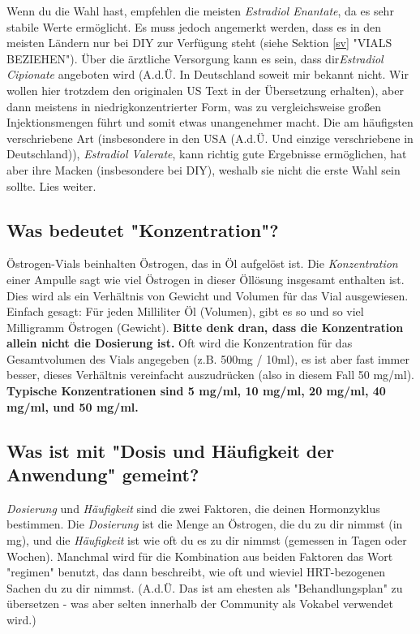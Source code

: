 \documentclass{article}
\begin{document}
Wenn du die Wahl hast, empfehlen die meisten \textit{Estradiol Enantate}, da es sehr stabile Werte ermöglicht. Es muss jedoch angemerkt werden, dass es in den meisten Ländern nur bei DIY zur Verfügung steht (siehe Sektion \ref{sv} "VIALS BEZIEHEN"). Über die ärztliche Versorgung kann es sein, dass dir\textit{Estradiol Cipionate} angeboten wird (A.d.Ü. In Deutschland soweit mir bekannt nicht. Wir wollen hier trotzdem den originalen US Text in der Übersetzung erhalten), aber dann meistens in niedrigkonzentrierter Form, was zu vergleichsweise großen Injektionsmengen führt und somit etwas unangenehmer macht. Die am häufigsten verschriebene Art (insbesondere in den USA (A.d.Ü. Und einzige verschriebene in Deutschland)), \textit{Estradiol Valerate}, kann richtig gute Ergebnisse ermöglichen, hat aber ihre Macken (insbesondere bei DIY), weshalb sie nicht die erste Wahl sein sollte. Lies weiter.

\subsection{Was bedeutet "Konzentration"?}

Östrogen-Vials beinhalten Östrogen, das in Öl aufgelöst ist. Die \textit{Konzentration} einer Ampulle sagt wie viel Östrogen in dieser Öllösung insgesamt enthalten ist. Dies wird als ein Verhältnis von Gewicht und Volumen für das Vial ausgewiesen. Einfach gesagt: Für jeden Milliliter Öl (Volumen), gibt es so und so viel Milligramm Östrogen (Gewicht). \textbf{Bitte denk dran, dass die Konzentration allein nicht die Dosierung ist.} Oft wird die Konzentration für das Gesamtvolumen des Vials angegeben (z.B. 500mg / 10ml), es ist aber fast immer besser, dieses Verhältnis vereinfacht auszudrücken (also in diesem Fall 50 mg/ml). \textbf{Typische Konzentrationen sind 5 mg/ml, 10 mg/ml, 20 mg/ml, 40 mg/ml, und 50 mg/ml.}

\subsection{Was ist mit "Dosis und Häufigkeit der Anwendung" gemeint?}

\textit{Dosierung} und \textit{Häufigkeit} sind die zwei Faktoren, die deinen Hormonzyklus bestimmen. Die \textit{Dosierung} ist die Menge an Östrogen, die du zu dir nimmst (in mg), und die \textit{Häufigkeit} ist wie oft du es zu dir nimmst (gemessen in Tagen oder Wochen). Manchmal wird für die Kombination aus beiden Faktoren das Wort "regimen" benutzt, das dann beschreibt, wie oft und wieviel HRT-bezogenen Sachen du zu dir nimmst. (A.d.Ü. 
 Das ist am ehesten als "Behandlungsplan" zu übersetzen - was aber selten innerhalb der Community als Vokabel verwendet wird.)
\end{document}
